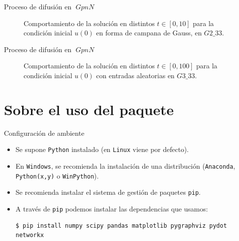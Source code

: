 \documentclass{beamer}
\theoremstyle{definition}
\numberwithin{equation}{section}
\DeclareMathOperator{\gpn}{\mathit{{GpnN}}}
\begin{document}
\begin{frame}{Proceso de difusión en $\gpn$}
	\begin{figure}
		\caption{Comportamiento de la solución en distintos $t\in[0,10]$ para la condición inicial $u(0)$ en forma de campana de Gauss, en $\mathit{G2\_33}$.}
	\end{figure}
\end{frame}
\begin{frame}{Proceso de difusión en $\gpn$}
	\begin{figure}
		\caption{Comportamiento de la solución en distintos $t\in[0,100]$ para la condición inicial $u(0)$ con entradas aleatorias en $\mathit{G3\_33}$.}
	\end{figure}
\end{frame}

\section{Sobre el uso del paquete}

\begin{frame}[fragile]{Configuración de ambiente}
	\begin{itemize}[<+- | alert@+>]
		\item Se supone \texttt{Python} instalado (en \texttt{Linux} viene por defecto).
		\item En \texttt{Windows}, se recomienda la instalación de una distribución (\texttt{Anaconda}, \texttt{Python(x,y)} o \texttt{WinPython}).
		\item Se recomienda instalar el sistema de gestión de paquetes \texttt{pip}.
		\item A través de \texttt{pip} podemos instalar las dependencias que usamos:
		\begin{lstlisting}[caption=Terminal o símbolo del sistema,basicstyle=\tiny]
		$ pip install numpy scipy pandas matplotlib pygraphviz pydot networkx	
		\end{lstlisting}
		
	\end{itemize}
\end{frame}
\end{document}
